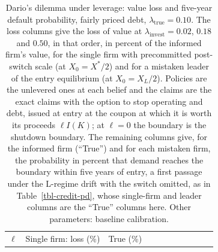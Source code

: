 \documentclass[
  11pt,
  letterpaper,
]{scrartcl}
\begin{document}
\begin{longtable}[]{@{}
  >{\raggedright\arraybackslash}p{}
  >{\centering\arraybackslash}p{}
  >{\raggedleft\arraybackslash}p{}
  >{\raggedleft\arraybackslash}p{}
  >{\raggedleft\arraybackslash}p{}
  >{\raggedleft\arraybackslash}p{}
  >{\centering\arraybackslash}p{}
  >{\raggedleft\arraybackslash}p{}
  >{\raggedleft\arraybackslash}p{}
  >{\raggedleft\arraybackslash}p{}
  >{\raggedleft\arraybackslash}p{}@{}}
\caption{Dario's dilemma under leverage: value loss and five-year
default probability, fairly priced debt,
\(\lambda_{\text{true}} = 0.10\). The loss columns give the loss of
value at \(\lambda_{\text{invest}} = 0.02\), \(0.18\) and \(0.50\), in
that order, in percent of the informed firm's value, for the single firm
with precommitted post-switch scale (at \(X_0 = X^*/2\)) and for a
mistaken leader of the entry equilibrium (at \(X_0 = X_L/2\)). Policies
are the unlevered ones at each belief and the claims are the exact
claims with the option to stop operating and debt, issued at entry at
the coupon at which it is worth its proceeds \(\ell I(K)\); at
\(\ell = 0\) the boundary is the shutdown boundary. The remaining
columns give, for the informed firm (``True'') and for each mistaken
firm, the probability in percent that demand reaches the boundary within
five years of entry, a first passage under the L-regime drift with the
switch omitted, as in Table~\ref{tbl-credit-pd}, whose single-firm and
leader columns are the ``True'' columns here. Other parameters: baseline
calibration.}\label{tbl-dilemma-tail}\tabularnewline
\toprule\noalign{}
\begin{minipage}[b]{\linewidth}\raggedright
\(\ell\)
\end{minipage} & \begin{minipage}[b]{\linewidth}\centering
Single firm: loss (\%)
\end{minipage} & \begin{minipage}[b]{\linewidth}\raggedleft
True (\%)
\end{minipage} & \begin{minipage}[b]{\linewidth}\raggedleft

\end{minipage}
\end{longtable}
\end{document}
